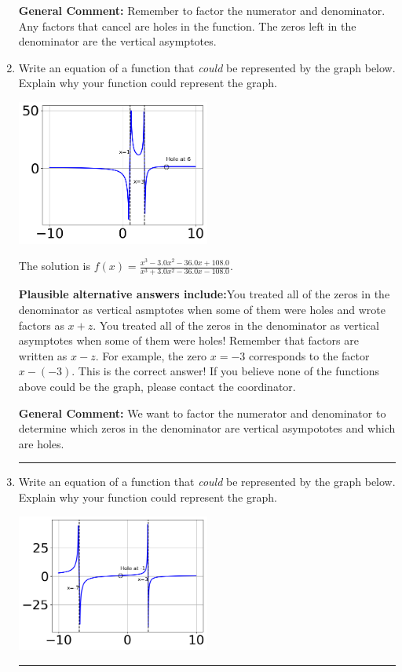 \documentclass{extbook}[14pt]
\newcommand{\litem}[1]{\item #1

\rule{\textwidth}{0.4pt}}
\begin{document}
\begin{enumerate}
{\textbf{General Comment:} Remember to factor the numerator and denominator. Any factors that cancel are holes in the function. The zeros left in the denominator are the vertical asymptotes.
}
\litem{
Write an equation of a function that \textit{could} be represented by the graph below. Explain why your function could represent the graph.

\begin{center}
    \includegraphics[width=0.5\textwidth]{../Figures/identifyGraphOfRationalFunctionC.png}
\end{center}


The solution is \( f(x)=\frac{x^{3} -3.0 x^{2} -36.0 x + 108.0}{x^{3} +3.0 x^{2} -36.0 x -108.0} \).\begin{enumerate}[label=\Alph*.]
\textbf{Plausible alternative answers include:}You treated all of the zeros in the denominator as vertical asmptotes when some of them were holes and wrote factors as $x+z$.
You treated all of the zeros in the denominator as vertical asymptotes when some of them were holes!
Remember that factors are written as $x-z$. For example, the zero $x=-3$ corresponds to the factor $x-(-3)$.
This is the correct answer!
If you believe none of the functions above could be the graph, please contact the coordinator.
\end{enumerate}

\textbf{General Comment:} We want to factor the numerator and denominator to determine which zeros in the denominator are vertical asympototes and which are holes.
}
\litem{
Write an equation of a function that \textit{could} be represented by the graph below. Explain why your function could represent the graph.

\begin{center}
    \includegraphics[width=0.5\textwidth]{../Figures/identifyGraphOfRationalFunctionCopyC.png}
\end{center}


}
\end{enumerate}
\end{document}
